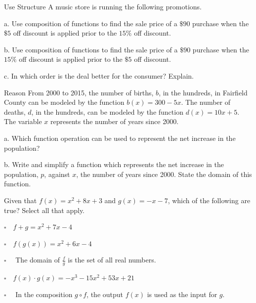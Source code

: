 \documentclass{article}
\newenvironment{practice}[2]{}{}        %
\newcommand{\answer}[1]{}               %
\newcommand{\placeholder}[2]{}          %
\begin{document}
\begin{practice}{32}{3}
Use Structure A music store is running the following promotions.

\placeholder{illustration}{Promotional ad reading ``HUGE SAVINGS AT O'RILEY'S MUSIC,'' ``\$5 off a purchase of \$20 or more,'' and ``Save an additional 15\% off your total purchase when you open a charge account.''}

a. Use composition of functions to find the sale price of a \(\$90\) purchase when the \(\$5\) off discount is applied prior to the \(15\%\) off discount.

b. Use composition of functions to find the sale price of a \(\$90\) purchase when the \(15\%\) off discount is applied prior to the \(\$5\) off discount.

c. In which order is the deal better for the consumer? Explain.

\answer{a. \(\$72.25\). b. \(\$71.50\). c. Since \(\$71.50<\$72.25\), it is a better deal for the consumer if the \(15\%\) discount is applied prior to the \(\$5\) off discount.}
\end{practice}

\begin{practice}{33}{2}
Reason From 2000 to 2015, the number of births, \(b\), in the hundreds, in Fairfield County can be modeled by the function \(b(x)=300-5x\). The number of deaths, \(d\), in the hundreds, can be modeled by the function \(d(x)=10x+5\). The variable \(x\) represents the number of years since 2000.

a. Which function operation can be used to represent the net increase in the population?

b. Write and simplify a function which represents the net increase in the population, \(p\), against \(x\), the number of years since 2000. State the domain of this function.

\answer{a. subtraction. b. \(p(x)=b(x)-d(x)=-15x+295\); the domain is the set of all real numbers \(x\) such that \(0<x<15\).}
\end{practice}

\begin{practice}{34}{2}
Given that \(f(x)=x^2+8x+3\) and \(g(x)=-x-7\), which of the following are true? Select all that apply.

\(\square\quad f+g=x^2+7x-4\)

\(\square\quad f(g(x))=x^2+6x-4\)

\(\square\quad\) The domain of \(\frac{f}{g}\) is the set of all real numbers.

\(\square\quad f(x)\cdot g(x)=-x^3-15x^2+53x+21\)

\(\square\quad\) In the composition \(g\circ f\), the output \(f(x)\) is used as the input for \(g\).

\answer{The true statements are \(f+g=x^2+7x-4\), \(f(g(x))=x^2+6x-4\), and in the composition \(g\circ f\), the output \(f(x)\) is used as the input for \(g\).}
\end{practice}
\end{document}

